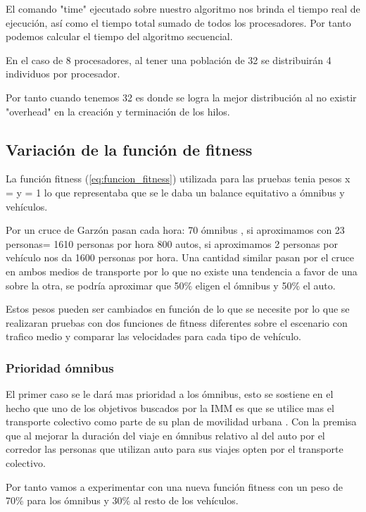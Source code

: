 El comando "time" ejecutado sobre nuestro algoritmo nos brinda el tiempo real de ejecución, así como el tiempo total sumado de todos los procesadores. Por tanto podemos calcular el tiempo del algoritmo secuencial.

En el caso de 8 procesadores, al tener una población de 32 se distribuirán 4 individuos por procesador.

Por tanto cuando tenemos 32 es donde se logra la mejor distribución al no existir "overhead" en la creación y terminación de los hilos.


\subsection{Variación de la función de fitness}

La función fitness (\ref{eq:funcion_fitness}) utilizada para las pruebas tenia pesos x = y = 1 lo que representaba que se le daba un balance equitativo a ómnibus y vehículos.

Por un cruce de Garzón pasan cada hora:
70 ómnibus , si aproximamos con 23 personas= 1610 personas por hora
800 autos, si aproximamos  2 personas por vehículo nos da 1600 personas por hora.
Una cantidad similar  pasan por el cruce en ambos medios de transporte por lo que no existe una tendencia a favor de una sobre la otra, se podría aproximar que 50\% eligen el ómnibus y 50\% el auto.



Estos pesos pueden ser cambiados en función de lo que se necesite por lo que se realizaran pruebas con dos funciones de fitness diferentes sobre el escenario con trafico medio y comparar las velocidades para cada tipo de vehículo.


\subsubsection{Prioridad ómnibus}
El primer caso se le dará mas prioridad a los ómnibus, esto se sostiene en el hecho que uno de los objetivos buscados por la IMM  es que se utilice mas el transporte colectivo como parte de su plan de movilidad urbana \citep{PlanMovilidad}. Con la premisa que al mejorar la duración del viaje en ómnibus relativo al del auto por el corredor las personas que utilizan auto para sus viajes opten por el transporte colectivo.

Por tanto vamos a experimentar con una nueva función fitness con un peso de 70\% para los ómnibus y 30\% al resto de los vehículos.


